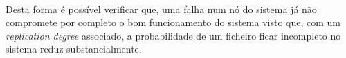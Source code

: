 \documentclass[11pt,oneside]{book}
\begin{document}
\begin{itemize}
        \paragraph{}
            Desta forma é possível verificar que, uma falha num nó do sistema já não compromete
            por completo o bom funcionamento do sistema visto que, com um \textit{replication degree}
            associado, a probabilidade de um ficheiro ficar incompleto no sistema reduz substancialmente.
           
            
    \end{itemize}
\end{document}
